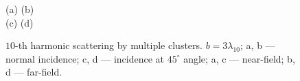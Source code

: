\begin{figure}[H]
    (a)\:
    (b)\:
    \\(c)\:
    (d)\:
    \caption{$10$-th harmonic scattering by multiple clusters. $b = 3\lambda_{10}$; a, b --- normal incidence; c, d --- incidence at $45^{\circ}$ angle; a, c --- near-field; b, d --- far-field.}
    \label{multi_sph_b3:image}
\end{figure}